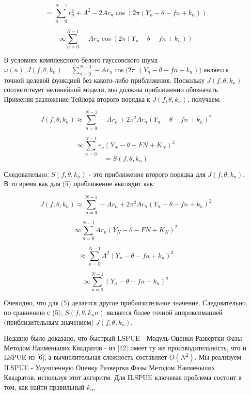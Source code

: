 $$ = \sum_{n=0}^{N-1} r_n^2+A^2-2Ar_n\cos(2\pi(Y_n-\theta-fn+k_n))$$

$$ \infty \sum_{n=0}^{N-1} -Ar_n\cos(2\pi(Y_n-\theta-fn+k_n))$$

В условиях комплексного белого гауссовского шума $\omega (n), J(f, \theta, k_n) = \sum_{n=0}^{N-1}-Ar_n\cos(2\pi$
$(Y_n-\theta-fn+k_n))$ 
является точной целевой функцией без какого-либо приближения. Поскольку $J(f, \theta, k_n)$ соответствует нелинейной модели, мы должны приближенно обозначать. Применяя разложение Тейлора второго порядка к $J(f, \theta, k_n)$, получаем:

$$
J(f, \theta, k_n) \approx \sum_{n=0}^{N-1} -Ar_n+2\pi^2Ar_n(Y_n-\theta-fn+k_n)^2
$$

\begin{equation}
\label{eq:equation1.48}	
	\infty \sum_{n=0}^{N-1} r_n (Y_N-\theta-FN+K_N)^2
\end{equation}
$$
=S(f,\theta,k_n)
$$


Следовательно, $S (f, \theta, k_n)$ - это приближение второго порядка для $J (f, \theta, k_n)$. В то время как для (5) приближение выглядит как:

$$
J(f, \theta, k_n) \approx \sum_{n=0}^{N-1} -Ar_n+2\pi^2Ar_n(Y_n-\theta-fn+k_n)^2
$$

$$
\infty \sum_{n=0}^{N-1} Ar_n (Y_N-\theta-FN+K_N)^2
$$

\begin{equation}
\label{eq:equation1.49}	
	\approx \sum_{n=0}^{N-1} A^2(Y_n-\theta-fn+k_n)^2
\end{equation}

$$
\infty \sum_{n=0}^{N-1} (Y_n-\theta-fn+k_n)^2
$$

Очевидно, что для (5) делается другое приблизительное значение. Следовательно, по сравнению с (5), $S (f, \theta, k_nn)$ является более точной аппроксимацией (приблизительным значением) $J (f, \theta, k_n)$.

Недавно было доказано, что быстрый LSPUE - Модуль Оценки Развёртки Фазы Методом Наименьших Квадратов - из [12] имеет ту же производительность, что и LSPUE из [6], а вычислительная сложность составляет $O(N^2)$. Мы реализуем ILSPUE - Улучшенную Оценку Развертки Фазы Методом Наименьших Квадратов, используя этот алгоритм. 
Для ILSPUE ключевая проблема состоит в том, как найти правильный $k_n$.

